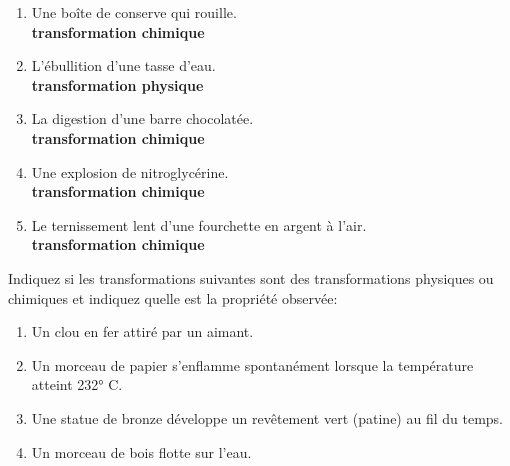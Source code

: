 \documentclass[
  11pt,
  a4paper,
  openany]{book}
\providecommand{\tightlist}{%
  \setlength{\itemsep}{0pt}\setlength{\parskip}{0pt}}
\begin{document}
\begin{Answer}

\begin{enumerate}
\def\labelenumi{\arabic{enumi}.}
\tightlist
\item
  Une boîte de conserve qui rouille.\\
  \textbf{transformation chimique}
\item
  L'ébullition d'une tasse d'eau.\\
  \textbf{transformation physique}
\item
  La digestion d'une barre chocolatée.\\
  \textbf{transformation chimique}
\item
  Une explosion de nitroglycérine.\\
  \textbf{transformation chimique}
\item
  Le ternissement lent d'une fourchette en argent à l'air.\\
  \textbf{transformation chimique}
\end{enumerate}

\end{Answer}

\begin{Exercise}

Indiquez si les transformations suivantes sont des transformations physiques ou chimiques et indiquez quelle est la propriété observée:

\begin{enumerate}
\def\labelenumi{\arabic{enumi}.}
\tightlist
\item
  Un clou en fer attiré par un aimant.\\
\item
  Un morceau de papier s'enflamme spontanément lorsque la température atteint 232° C.\\
\item
  Une statue de bronze développe un revêtement vert (patine) au fil du temps.\\
\item
  Un morceau de bois flotte sur l'eau.
\end{enumerate}

\end{Exercise}
\end{document}
